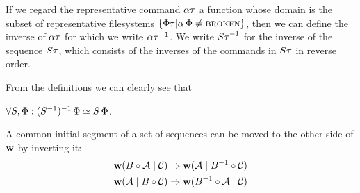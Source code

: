 \begin{mydef}
If we regard the representative command $\alpha\tau$ a function whose
domain is the subset of representative filesystems $\{\Phi\tau | \alpha\,\Phi\neq\text{\normalfont\scshape{broken}}\}$,
then we can define the inverse of $\alpha\tau$
for which we write $\alpha\tau^{-1}$.
We write ${S\tau}^{-1}$ for the inverse of the sequence $S\tau$, which consists of the inverses of the commands in $S\tau$
in reverse order.
\end{mydef}


From the definitions we can clearly see that
\begin{mycor}\label{negneg_is_typeeq} %
$\forall S, \Phi: (S^{-1})^{-1}\,\Phi\simeq S\,\Phi$.
\end{mycor}

\begin{mylem}\label{r_invmove}
A common initial segment of a set of sequences can be moved to the other side of $\mathbf{w}$ by inverting it:
\begin{gather*}
\mathbf{w}({B\circ \mathcal{A}}\mathrel{|}{\mathcal{C}}) \Rightarrow \mathbf{w}({\mathcal{A}}\mathrel{|}{B^{-1}\circ \mathcal{C}}) \\
\mathbf{w}({\mathcal{A}}\mathrel{|}{B\circ \mathcal{C}}) \Rightarrow \mathbf{w}({B^{-1}\circ \mathcal{A}}\mathrel{|}{\mathcal{C}})
\end{gather*}
\end{mylem}
